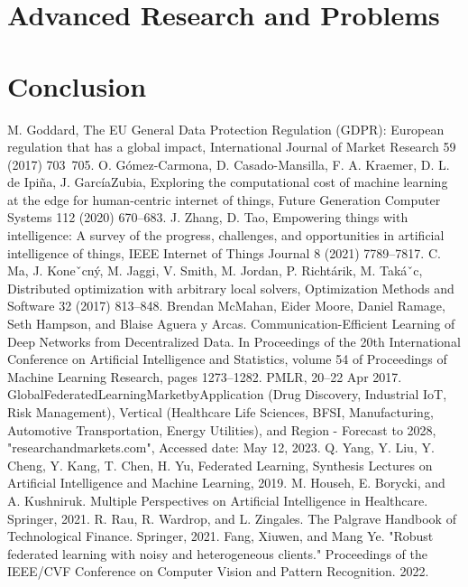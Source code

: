\documentclass[conference]{IEEEtran}
\begin{document}
\section{Advanced Research and Problems}
\section{Conclusion}




\begin{thebibliography}{00}
     M. Goddard, The EU General Data Protection Regulation (GDPR): European regulation that has a global impact, International Journal of Market Research 59 (2017) 703~705.
     O. Gómez-Carmona, D. Casado-Mansilla, F. A. Kraemer, D. L. de Ipiña, J. GarcíaZubia, Exploring the computational cost of machine learning at the edge for human-centric internet of things, Future Generation Computer Systems 112 (2020) 670–683.
     J. Zhang, D. Tao, Empowering things with intelligence: A survey of the progress, challenges, and opportunities in artificial intelligence of things, IEEE Internet of Things Journal 8 (2021) 7789–7817.
     C. Ma, J. Koneˇcný, M. Jaggi, V. Smith, M. Jordan, P. Richtárik, M. Takáˇc, Distributed optimization with arbitrary local solvers, Optimization Methods and Software 32 (2017) 813–848.
     Brendan McMahan, Eider Moore, Daniel Ramage, Seth Hampson, and Blaise Aguera y Arcas. Communication-Efficient Learning of Deep Networks from Decentralized Data. In Proceedings of the 20th International Conference on Artificial Intelligence and Statistics, volume 54 of Proceedings of Machine Learning Research, pages 1273–1282. PMLR, 20–22 Apr 2017.
     GlobalFederatedLearningMarketbyApplication (Drug Discovery, Industrial IoT, Risk Management), Vertical (Healthcare  Life Sciences, BFSI, Manufacturing, Automotive Transportation, Energy  Utilities), and Region - Forecast to 2028, "researchandmarkets.com", Accessed date: May 12, 2023.
     Q. Yang, Y. Liu, Y. Cheng, Y. Kang, T. Chen, H. Yu, Federated Learning, Synthesis Lectures on Artificial Intelligence and Machine Learning, 2019.
     M. Househ, E. Borycki, and A. Kushniruk. Multiple Perspectives on Artificial Intelligence in Healthcare. Springer, 2021.
     R. Rau, R. Wardrop, and L. Zingales. The Palgrave Handbook of Technological Finance. Springer, 2021.
     Fang, Xiuwen, and Mang Ye. "Robust federated learning with noisy and heterogeneous clients." Proceedings of the IEEE/CVF Conference on Computer Vision and Pattern Recognition. 2022.

\end{thebibliography}
\end{document}

